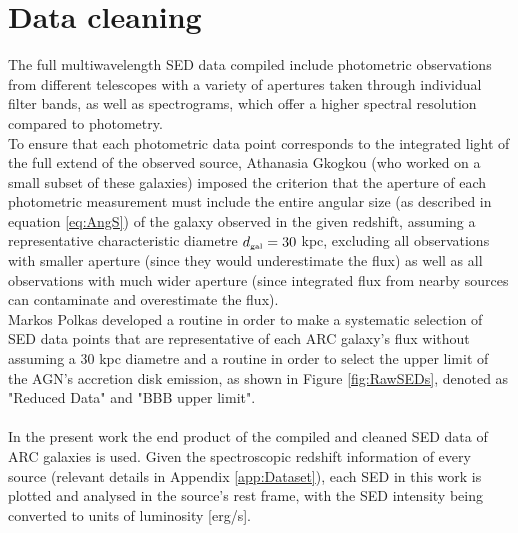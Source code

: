 \section{Data cleaning}\label{sec:DataClean}
The full multiwavelength SED data compiled include photometric observations from different telescopes with a variety of apertures taken through individual filter bands, as well as spectrograms, which offer a higher spectral resolution compared to photometry.\\
To ensure that each photometric data point corresponds to the integrated light of the full extend of the observed source, Athanasia Gkogkou (who worked on a small subset of these galaxies) imposed the criterion that the aperture of each photometric measurement must include the entire angular size (as described in equation \ref{eq:AngS}) of the galaxy observed in the given redshift, assuming a representative characteristic diametre $d_{\mbox{\tiny{gal}}}=30 $ kpc, excluding all observations with smaller aperture (since they would underestimate the flux) as well as all observations with much wider aperture (since integrated flux from nearby sources can contaminate and overestimate the flux). \\
Markos Polkas developed a routine in order to make a systematic selection of SED data points that are representative of each ARC galaxy's flux without assuming a $30$ kpc diametre and a routine in order to select the upper limit of the AGN's accretion disk emission, as shown in Figure \ref{fig:RawSEDs}, denoted as "Reduced Data" and "BBB upper limit".\\ \\
In the present work the end product of the compiled and cleaned SED data of ARC galaxies is used. Given the spectroscopic redshift information of every source (relevant details in Appendix \ref{app:Dataset}), each SED in this work is plotted and analysed in the source's rest frame, with the SED intensity being converted to units of luminosity [erg/s].

